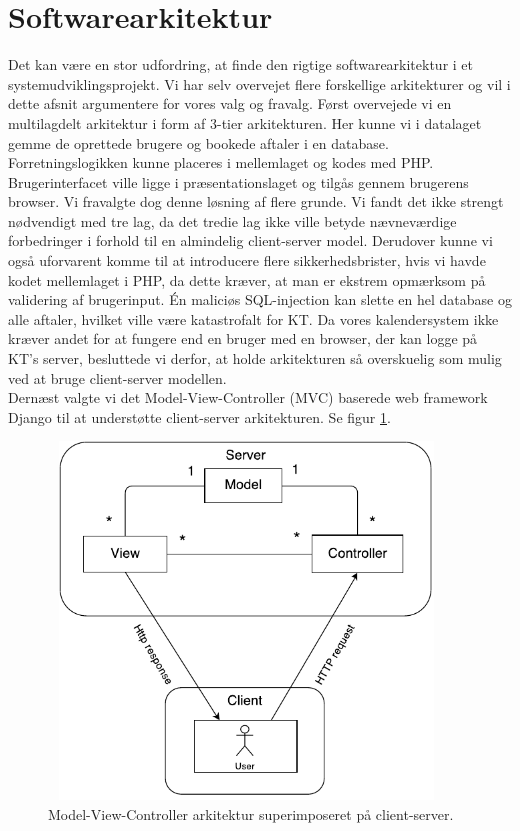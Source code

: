 \documentclass[12pt]{article}   %
\begin{document}
\section{Softwarearkitektur}
Det kan være en stor udfordring, at finde den rigtige softwarearkitektur i et
systemudviklingsprojekt. Vi har selv overvejet flere forskellige arkitekturer 
og vil i dette afsnit argumentere for vores valg og fravalg. Først overvejede
vi en multilagdelt arkitektur i form af 3-tier arkitekturen. Her kunne vi i
datalaget gemme de oprettede brugere og bookede aftaler i en database.
Forretningslogikken kunne placeres i mellemlaget og kodes med PHP.
Brugerinterfacet ville ligge i præsentationslaget og tilgås gennem brugerens
browser. Vi fravalgte dog denne løsning af flere grunde. Vi fandt det ikke
strengt nødvendigt med tre lag, da det tredie lag ikke ville betyde
nævneværdige forbedringer i forhold til en almindelig client-server model.
Derudover kunne vi også uforvarent komme til at introducere flere
sikkerhedsbrister, hvis vi havde kodet mellemlaget i PHP, da dette kræver, at 
man er ekstrem opmærksom på validering af brugerinput. Én maliciøs SQL-injection
kan slette en hel database og alle aftaler, hvilket ville være katastrofalt for
KT. Da vores kalendersystem ikke kræver andet for at fungere end en bruger med
en browser, der kan logge på KT's server, besluttede vi derfor, at holde 
arkitekturen så overskuelig som mulig ved at bruge client-server modellen. \\
Dernæst valgte vi det Model-View-Controller (MVC) baserede web framework Django til
at understøtte client-server arkitekturen. Se figur \ref{fig:mvc}.\\

\begin{figure}[!ht]
	\centering
\includegraphics[width=10.5cm, height=9.5cm]{mvc.pdf}
\caption{Model-View-Controller arkitektur superimposeret på client-server.}
\label{fig:mvc}
\end{figure}
\end{document}
